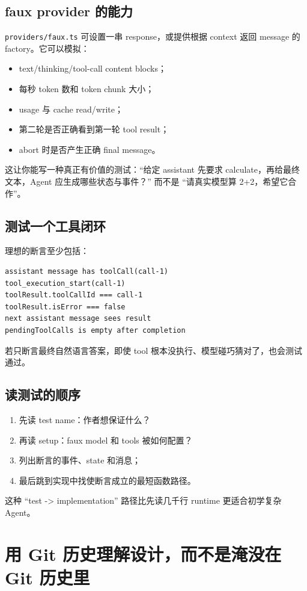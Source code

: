 \documentclass[UTF8,openany,11pt]{ctexbook}
\newcommand{\pathref}[1]{\texttt{#1}}
\begin{document}
\section{faux provider 的能力}
\pathref{providers/faux.ts} 可设置一串 response，或提供根据 context 返回 message 的 factory。它可以模拟：
\begin{itemize}
\item text/thinking/tool-call content blocks；
\item 每秒 token 数和 token chunk 大小；
\item usage 与 cache read/write；
\item 第二轮是否正确看到第一轮 tool result；
\item abort 时是否产生正确 final message。
\end{itemize}

这让你能写一种真正有价值的测试：``给定 assistant 先要求 calculate，再给最终文本，Agent 应生成哪些状态与事件？'' 而不是 ``请真实模型算 2+2，希望它合作''。

\section{测试一个工具闭环}
理想的断言至少包括：
\begin{Verbatim}[fontsize=\small]
assistant message has toolCall(call-1)
tool_execution_start(call-1)
toolResult.toolCallId === call-1
toolResult.isError === false
next assistant message sees result
pendingToolCalls is empty after completion
\end{Verbatim}
若只断言最终自然语言答案，即使 tool 根本没执行、模型碰巧猜对了，也会测试通过。

\section{读测试的顺序}
\begin{enumerate}
\item 先读 test name：作者想保证什么？
\item 再读 setup：faux model 和 tools 被如何配置？
\item 列出断言的事件、state 和消息；
\item 最后跳到实现中找使断言成立的最短函数路径。
\end{enumerate}
这种 ``test -> implementation'' 路径比先读几千行 runtime 更适合初学复杂 Agent。

\chapter{用 Git 历史理解设计，而不是淹没在 Git 历史里}
\end{document}
